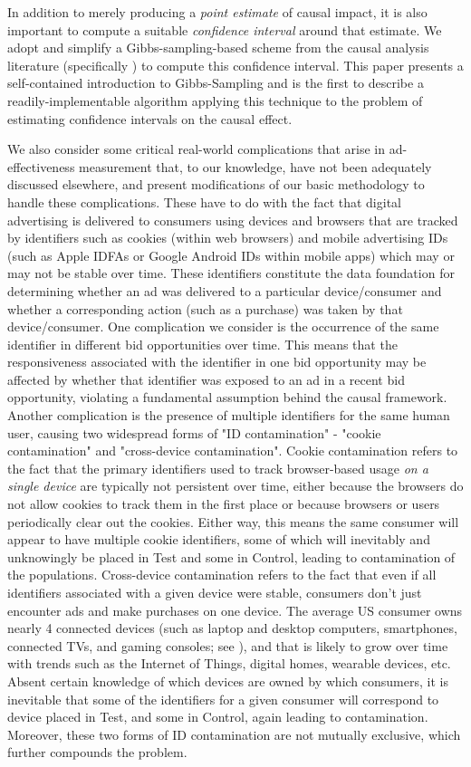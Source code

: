 \documentclass[11pt,a4paper]{article}
\theoremstyle{definition}
\theoremstyle{remark}
\theoremstyle{definition}
\theoremstyle{definition}
\theoremstyle{definition}
\theoremstyle{definition}
\theoremstyle{definition}
\theoremstyle{definition}
\begin{document}
In addition to merely producing a \textit{point estimate} of causal impact, it is also important to compute a suitable \textit{confidence interval} around that estimate. We adopt and simplify a Gibbs-sampling-based scheme from the causal analysis literature (specifically \cite{Chickering1996}) to compute this confidence interval. This paper presents a self-contained introduction to Gibbs-Sampling and is the first to describe a readily-implementable algorithm applying this technique to the problem of estimating confidence intervals on the causal effect. 

We also consider some critical real-world complications that arise in ad-effectiveness measurement that, to our knowledge, have not been adequately discussed elsewhere, and present modifications of our basic methodology to handle these complications. These have to do with the fact that digital advertising is delivered to consumers using devices and browsers that are tracked by identifiers such as cookies (within web browsers) and mobile advertising IDs (such as Apple IDFAs or Google Android IDs within mobile apps) which may or may not be stable over time. These identifiers constitute the data foundation for determining whether an ad was delivered to a particular device/consumer and whether a corresponding action (such as a purchase) was taken by that device/consumer. One complication we consider is the occurrence of the same identifier in different bid opportunities over time. This means that the responsiveness associated with the identifier in one bid opportunity may be affected by whether that identifier was exposed to an ad in a recent bid opportunity, violating a fundamental assumption behind the causal framework. Another complication is the presence of multiple identifiers for the same human user, causing two widespread forms of "ID contamination" - "cookie contamination" and "cross-device contamination". Cookie contamination refers to the fact that the primary identifiers used to track browser-based usage \textit{on a single device} are typically not persistent over time, either because the browsers do not allow cookies to track them in the first place or because browsers or users periodically clear out the cookies. Either way, this means the same consumer will appear to have multiple cookie identifiers, some of which will inevitably and unknowingly be placed in Test and some in Control, leading to contamination of the populations. Cross-device contamination refers to the fact that even if all identifiers associated with a given device were stable, consumers don’t just encounter ads and make purchases on one device. The average US consumer owns nearly 4 connected devices (such as laptop and desktop computers, smartphones, connected TVs, and gaming consoles; see   \cite{buckle-2016}),
and that is likely to grow over time with trends such as the Internet of Things, digital homes, wearable devices, etc. Absent certain knowledge of which devices are owned by which consumers, it is inevitable that some of the identifiers for a given consumer will correspond to device placed in Test, and some in Control, again leading to contamination. Moreover, these two forms of ID contamination are not mutually exclusive, which further compounds the problem.
\end{document}
